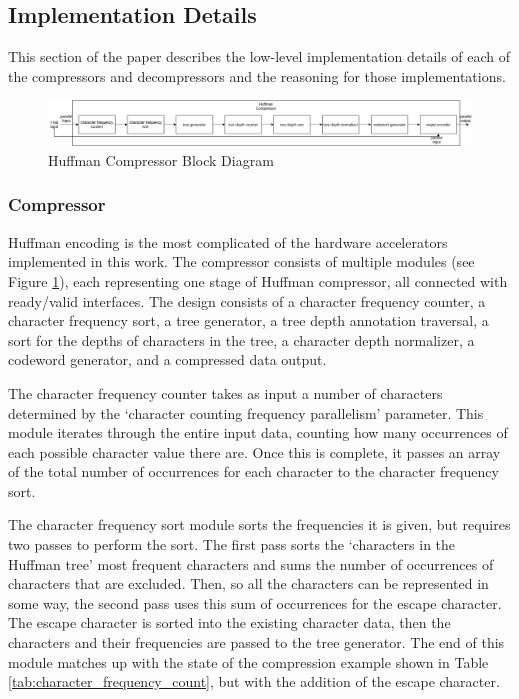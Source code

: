 \documentclass[doublespace,nopageskip]{VTthesis}
\begin{document}
\subsection{Implementation Details}\label{se:huffman_implementation_details}
This section of the paper describes the low-level implementation details of each of the compressors and decompressors and the reasoning for those implementations.

\begin{figure}[htb]
	\centering
	\includegraphics[scale=0.33]{Huffman Compressor Block Diagram.png}
	\caption{Huffman Compressor Block Diagram}
	\label{fig:huffman_compressor_block_diagram}
\end{figure}

\subsubsection{Compressor}\label{sss:huffman_compressor_implementation}
Huffman encoding is the most complicated of the hardware accelerators implemented in this work. The compressor consists of multiple modules (see Figure \ref{fig:huffman_compressor_block_diagram}), each representing one stage of Huffman compressor, all connected with ready/valid interfaces. The design consists of a character frequency counter, a character frequency sort, a tree generator, a tree depth annotation traversal, a sort for the depths of characters in the tree, a character depth normalizer, a codeword generator, and a compressed data output.

The character frequency counter takes as input a number of characters determined by the `character counting frequency parallelism' parameter. This module iterates through the entire input data, counting how many occurrences of each possible character value there are. Once this is complete, it passes an array of the total number of occurrences for each character to the character frequency sort.

The character frequency sort module sorts the frequencies it is given, but requires two passes to perform the sort. The first pass sorts the `characters in the Huffman tree' most frequent characters and sums the number of occurrences of characters that are excluded. Then, so all the characters can be represented in some way, the second pass uses this sum of occurrences for the escape character. The escape character is sorted into the existing character data, then the characters and their frequencies are passed to the tree generator. The end of this module matches up with the state of the compression example shown in Table \ref{tab:character_frequency_count}, but with the addition of the escape character. 
\end{document}
